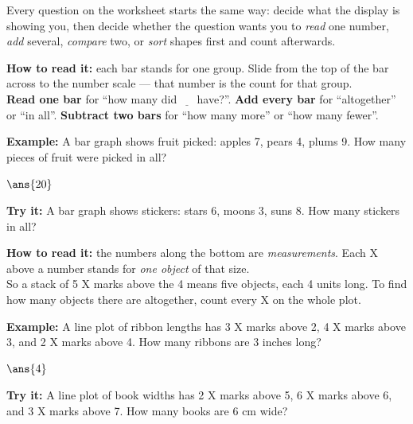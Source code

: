 \documentclass[12pt]{article}
\begin{document}

\noindent\small Every question on the worksheet starts the same way: decide
what the display is showing you, then decide whether the question wants you to
\emph{read} one number, \emph{add} several, \emph{compare} two, or \emph{sort}
shapes first and count afterwards.
\normalsize

\begin{formulabox}
\textbf{How to read it:} each bar stands for one group. Slide from the top of
the bar across to the number scale --- that number is the count for that
group.\\[3pt]
\textbf{Read one bar} for ``how many did $\underline{\phantom{xx}}$ have?''.
\textbf{Add every bar} for ``altogether'' or ``in all''.
\textbf{Subtract two bars} for ``how many more'' or ``how many fewer''.
\end{formulabox}
\begin{examplebox}
\textbf{Example:} A bar graph shows fruit picked: apples 7, pears 4, plums 9.
How many pieces of fruit were picked in all?
\par
$\ans{20}$
\end{examplebox}
\begin{tryitbox}
\textbf{Try it:} A bar graph shows stickers: stars 6, moons 3, suns 8. How
many stickers in all?\\[2pt]
\end{tryitbox}

\begin{formulabox}
\textbf{How to read it:} the numbers along the bottom are \emph{measurements}.
Each X above a number stands for \emph{one object} of that size.\\[3pt]
So a stack of 5 X marks above the 4 means five objects, each 4 units long. To
find how many objects there are altogether, count every X on the whole plot.
\end{formulabox}
\begin{examplebox}
\textbf{Example:} A line plot of ribbon lengths has 3 X marks above 2, 4 X
marks above 3, and 2 X marks above 4. How many ribbons are 3 inches long?
\par
$\ans{4}$
\end{examplebox}
\begin{tryitbox}
\textbf{Try it:} A line plot of book widths has 2 X marks above 5, 6 X marks
above 6, and 3 X marks above 7. How many books are 6 cm wide?\\[2pt]
\end{tryitbox}
\end{document}
